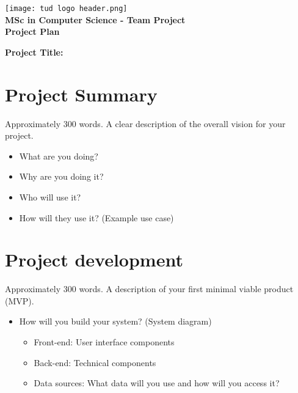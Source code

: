 \documentclass[a4paper,12pt]{article}
\title{}
\author{}
\date{}
\begin{document}
\begin{center}
    \texttt{[image: tud logo header.png]}\\ %
    \vspace{0.3cm}
    {\Large \textbf{MSc in Computer Science - Team Project}}\\
    \vspace{0.2cm}
    {\large \textbf{Project Plan}}
\end{center}

\vspace{1cm} %

\noindent
\textbf{Project Title:} \underline{\hspace{10cm}} %

\vspace{1cm} %

\section{Project Summary}

\vspace{0.2cm}
Approximately 300 words. A clear description of the overall vision for your project.
\begin{itemize}
    \item What are you doing?
    \item Why are you doing it?
    \item Who will use it?
    \item How will they use it? (Example use case)
\end{itemize}

\newpage
\section{Project development}

\vspace{0.2cm}
Approximately 300 words. A description of your first minimal viable product (MVP).
\begin{itemize}
    \item How will you build your system? (System diagram)
    \begin{itemize}
        \item Front-end: User interface components
        \item Back-end: Technical components
        \item Data sources: What data will you use and how will you access it?
    \end{itemize}
\end{itemize}
\end{document}
